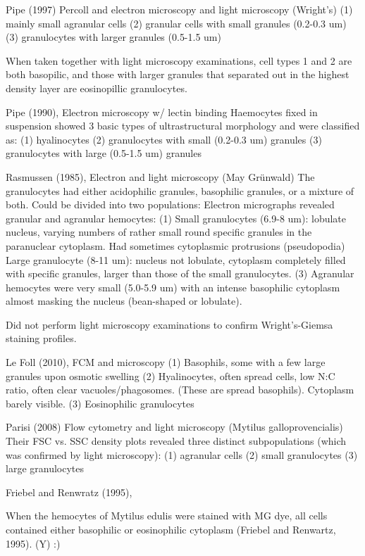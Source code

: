 Pipe (1997) Percoll and electron microscopy and light microscopy (Wright's)
(1) mainly small agranular cells 
(2) granular cells with small granules (0.2-0.3 um)
(3) granulocytes with larger granules (0.5-1.5 um)

When taken together with light microscopy examinations, cell types 1 and 2 are both basopilic, and those with larger granules that separated out in the highest density layer are eosinopillic granulocytes.

Pipe (1990), Electron microscopy w/ lectin binding
Haemocytes fixed in suspension showed 3 basic types of ultrastructural morphology and were classified as:
(1) hyalinocytes
(2) granulocytes with small (0.2-0.3 um) granules
(3) granulocytes with large (0.5-1.5 um) granules

Rasmussen (1985), Electron and light microscopy (May Grünwald) \cite{Rasmussen1985}
The granulocytes had either acidophilic granules, basophilic granules, or a mixture of both. Could be divided into two populations:
Electron micrographs revealed granular and agranular hemocytes:
(1) Small granulocytes (6.9-8 um): lobulate nucleus, varying numbers of rather small round specific granules in the paranuclear cytoplasm. Had sometimes cytoplasmic protrusions (pseudopodia)
Large granulocyte (8-11 um): nucleus not lobulate, cytoplasm completely filled with specific granules, larger than those of the small granulocytes.
(3) Agranular hemocytes were very small (5.0-5.9 um) with an intense basophilic cytoplasm almost masking the nucleus (bean-shaped or lobulate).

Did not perform light microscopy examinations to confirm Wright's-Giemsa staining profiles.

Le Foll (2010), FCM and microscopy \cite{LeFoll2010}
(1) Basophils, some with a few large granules upon osmotic swelling
(2) Hyalinocytes, often spread cells, low N:C ratio, often clear vacuoles/phagosomes. (These are spread basophils). Cytoplasm barely visible.
(3) Eosinophilic granulocytes

Parisi (2008) Flow cytometry and light microscopy (Mytilus galloprovencialis)
Their FSC vs. SSC density plots revealed three distinct subpopulations (which was confirmed by light microscopy):
(1) agranular cells
(2) small granulocytes
(3) large granulocytes

Friebel and Renwratz (1995),

When the hemocytes of Mytilus edulis were stained with MG dye, all cells contained either basophilic or eosinophilic cytoplasm (Friebel and Renwartz, 1995). (Y) :)

